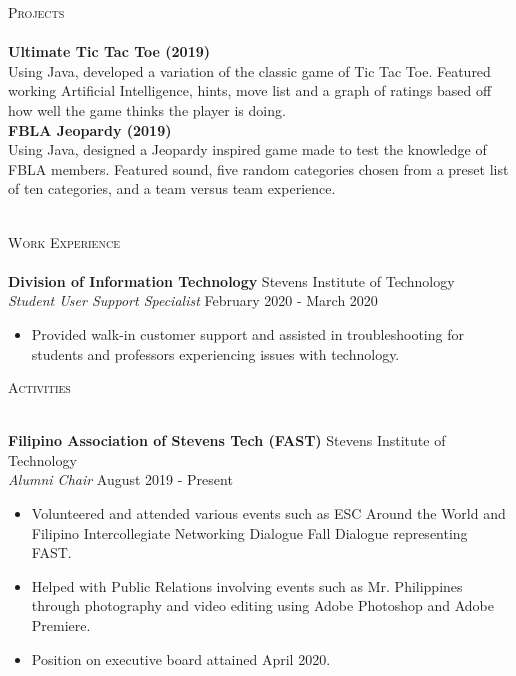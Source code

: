 \documentclass[10pt]{article}
\newcommand{\lineunder} {
    \vspace*{-8pt} \\
    \hspace*{-18pt} \hrulefill \\
}
\newcommand{\header} [1] {
    {\hspace*{-18pt}\vspace*{6pt} \textsc{#1}}
    \vspace*{-6pt} \lineunder
}
\begin{document}
\header{Projects}
{\textbf{Ultimate Tic Tac Toe (2019)}} \hfill 
\\
Using Java, developed a variation of the classic game of Tic Tac Toe. Featured working Artificial Intelligence, hints, move list and a graph of ratings based off how well the game thinks the player is doing.\\
\vspace*{2mm}
{\textbf{FBLA Jeopardy (2019)}} \hfill 
\\
Using Java, designed a Jeopardy inspired game made to test the knowledge of FBLA members. Featured sound, five random categories chosen from a preset list of ten categories, and a team versus team experience.\\
\vspace*{2mm}
\ 
\header{Work Experience}
\vspace{1mm}
\textbf{Division of Information Technology} \hfill Stevens Institute of Technology\\
\textit{Student User Support Specialist} \hfill February 2020 - March 2020\\
\vspace{-1mm}
\begin{itemize} \itemsep 1pt
	\item Provided walk-in customer support and assisted in troubleshooting for students and professors experiencing issues with technology.
\end{itemize}

\header{Activities}
\vspace{1mm}

\textbf{Filipino Association of Stevens Tech (FAST)} \hfill Stevens Institute of Technology\\
\textit{Alumni Chair} \hfill August 2019 - Present\\
\vspace{-1mm}
\begin{itemize} \itemsep 1pt
	\item Volunteered and attended various events such as ESC Around the World and Filipino Intercollegiate Networking Dialogue Fall Dialogue representing FAST.
	\item Helped with Public Relations involving events such as Mr. Philippines through photography and video editing using Adobe Photoshop and Adobe Premiere.
	\item Position on executive board attained April 2020.
\end{itemize}
\end{document}
